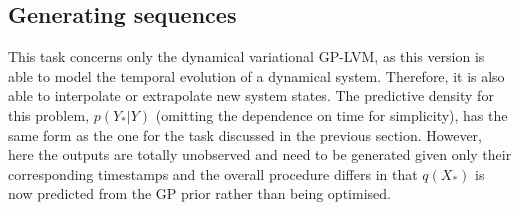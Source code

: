 \documentclass [10pt , a4paper]{article}
\begin{document}

\subsection{\label{predictions2} Generating sequences}
This task concerns only the dynamical variational GP-LVM, as this version is able to model the temporal evolution of a dynamical system.
Therefore, it is also able to interpolate or extrapolate new system states.
The predictive density for this problem, $p(Y_*|Y)$ (omitting the dependence on time for simplicity), has the same form as the one
for the task discussed in the previous section. However, here the outputs are totally unobserved and need to be generated given only
their corresponding timestamps and the overall procedure differs in that $q(X_*)$ is now predicted from the GP prior rather than being
optimised.
\end{document}
